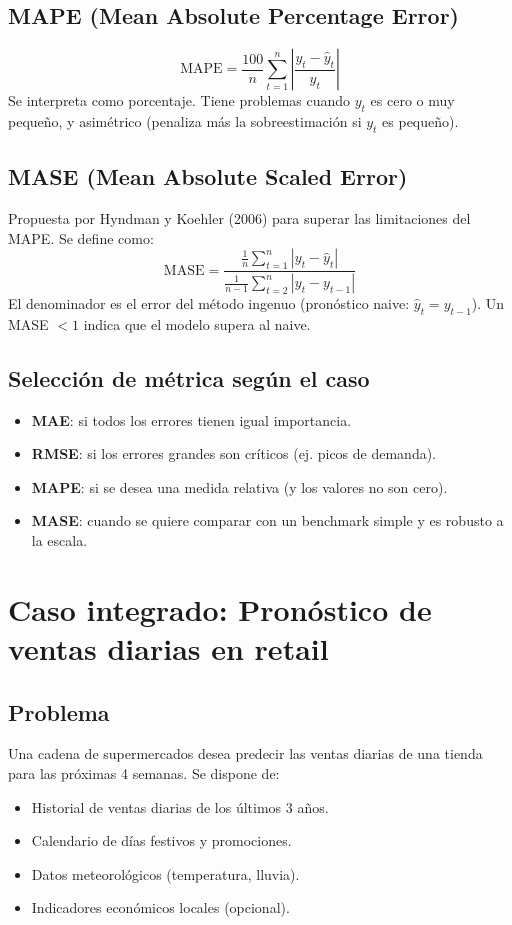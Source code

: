 \documentclass[12pt,a4paper,openany,oneside]{book}
\begin{document}
\subsection{MAPE (Mean Absolute Percentage Error)}
\[
\text{MAPE} = \frac{100}{n} \sum_{t=1}^n \left| \frac{y_t - \hat{y}_t}{y_t} \right|
\]
Se interpreta como porcentaje. Tiene problemas cuando \(y_t\) es cero o muy pequeño, y asimétrico (penaliza más la sobreestimación si \(y_t\) es pequeño).

\subsection{MASE (Mean Absolute Scaled Error)}
Propuesta por Hyndman y Koehler (2006) para superar las limitaciones del MAPE. Se define como:
\[
\text{MASE} = \frac{\frac{1}{n} \sum_{t=1}^n |y_t - \hat{y}_t|}{\frac{1}{n-1} \sum_{t=2}^n |y_t - y_{t-1}|}
\]
El denominador es el error del método ingenuo (pronóstico naive: \(\hat{y}_t = y_{t-1}\)). Un MASE \(<1\) indica que el modelo supera al naive.

\subsection{Selección de métrica según el caso}
\begin{itemize}
    \item \textbf{MAE}: si todos los errores tienen igual importancia.
    \item \textbf{RMSE}: si los errores grandes son críticos (ej. picos de demanda).
    \item \textbf{MAPE}: si se desea una medida relativa (y los valores no son cero).
    \item \textbf{MASE}: cuando se quiere comparar con un benchmark simple y es robusto a la escala.
\end{itemize}

\section{Caso integrado: Pronóstico de ventas diarias en retail}

\subsection{Problema}
Una cadena de supermercados desea predecir las ventas diarias de una tienda para las próximas 4 semanas. Se dispone de:
\begin{itemize}
    \item Historial de ventas diarias de los últimos 3 años.
    \item Calendario de días festivos y promociones.
    \item Datos meteorológicos (temperatura, lluvia).
    \item Indicadores económicos locales (opcional).
\end{itemize}
\end{document}
